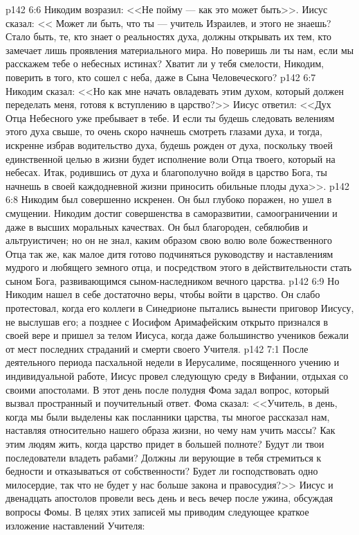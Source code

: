 \vs p142 6:6 Никодим возразил: <<Не пойму --- как это может быть>>. Иисус сказал: << Может ли быть, что ты --- учитель Израилев, и этого не знаешь? Стало быть, те, кто знает о реальностях духа, должны открывать их тем, кто замечает лишь проявления материального мира. Но поверишь ли ты нам, если мы расскажем тебе о небесных истинах? Хватит ли у тебя смелости, Никодим, поверить в того, кто сошел с неба, даже в Сына Человеческого?
\vs p142 6:7 Никодим сказал: <<Но как мне начать овладевать этим духом, который должен переделать меня, готовя к вступлению в царство?>> Иисус ответил: <<Дух Отца Небесного уже пребывает в тебе. И если ты будешь следовать велениям этого духа свыше, то очень скоро начнешь смотреть глазами духа, и тогда, искренне избрав водительство духа, будешь рожден от духа, поскольку твоей единственной целью в жизни будет исполнение воли Отца твоего, который на небесах. Итак, родившись от духа и благополучно войдя в царство Бога, ты начнешь в своей каждодневной жизни приносить обильные плоды духа>>.
\vs p142 6:8 Никодим был совершенно искренен. Он был глубоко поражен, но ушел в смущении. Никодим достиг совершенства в саморазвитии, самоограничении и даже в высших моральных качествах. Он был благороден, себялюбив и альтруистичен; но он не знал, каким образом  свою волю воле божественного Отца так же, как малое дитя готово подчиняться руководству и наставлениям мудрого и любящего земного отца, и посредством этого в действительности стать сыном Бога, развивающимся сыном\hyp{}наследником вечного царства.
\vs p142 6:9 Но Никодим нашел в себе достаточно веры, чтобы войти в царство. Он слабо протестовал, когда его коллеги в Синедрионе пытались вынести приговор Иисусу, не выслушав его; а позднее с Иосифом Аримафейским открыто признался в своей вере и пришел за телом Иисуса, когда даже большинство учеников бежали от мест последних страданий и смерти своего Учителя.
\vs p142 7:1 После деятельного периода пасхальной недели в Иерусалиме, посященного учению и индивидуальной работе, Иисус провел следующую среду в Вифании, отдыхая со своими апостолами. В этот день после полудня Фома задал вопрос, который вызвал пространный и поучительный ответ. Фома сказал: <<Учитель, в день, когда мы были выделены как посланники царства, ты многое рассказал нам, наставляя относительно нашего образа жизни, но чему нам учить массы? Как этим людям жить, когда царство придет в большей полноте? Будут ли твои последователи владеть рабами? Должны ли верующие в тебя стремиться к бедности и отказываться от собственности? Будет ли господствовать одно милосердие, так что не будет у нас больше закона и правосудия?>> Иисус и двенадцать апостолов провели весь день и весь вечер после ужина, обсуждая вопросы Фомы. В целях этих записей мы приводим следующее краткое изложение наставлений Учителя:
